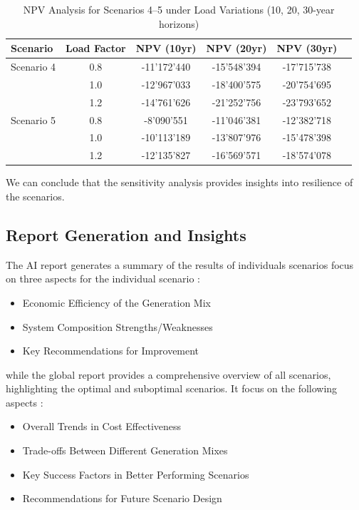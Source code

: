 \begin{table}[ht]
\centering
\caption{NPV Analysis for Scenarios 4--5 under Load Variations (10, 20, 30-year horizons)}
\label{tab:npv_sensitivity}
\begin{tabular}{lccccc}
\hline
\textbf{Scenario} & \textbf{Load Factor} & \textbf{NPV (10yr)} & \textbf{NPV (20yr)} & \textbf{NPV (30yr)} \\
\hline
Scenario 4 & 0.8 & -11'172'440 & -15'548'394 & -17'715'738 \\
           & 1.0 & -12'967'033 & -18'400'575 & -20'754'695 \\
           & 1.2 & -14'761'626 & -21'252'756 & -23'793'652 \\
\hline
Scenario 5 & 0.8 & -8'090'551 & -11'046'381 & -12'382'718 \\
           & 1.0 & -10'113'189 & -13'807'976 & -15'478'398 \\
           & 1.2 & -12'135'827 & -16'569'571 & -18'574'078 \\
\hline
\end{tabular}
\end{table}

We can conclude that the sensitivity analysis provides insights into resilience of the scenarios.


\subsection{Report Generation and Insights}
The AI report generates a summary of the results of individuals scenarios focus on three aspects for the individual 
scenario : 
\begin{itemize}
  \item Economic Efficiency of the Generation Mix
  \item System Composition Strengths/Weaknesses
  \item Key Recommendations for Improvement
\end{itemize}

while the global report provides a comprehensive overview of all scenarios, highlighting the 
optimal and suboptimal scenarios. It focus on the following aspects : 
\begin{itemize}
  \item Overall Trends in Cost Effectiveness
  \item Trade-offs Between Different Generation Mixes
  \item Key Success Factors in Better Performing Scenarios
  \item Recommendations for Future Scenario Design
\end{itemize}

